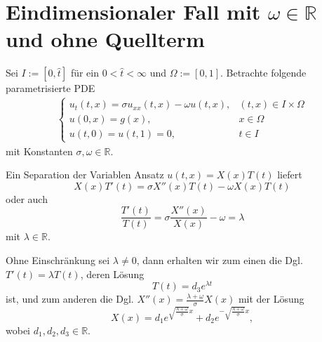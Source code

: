
\section{Eindimensionaler Fall mit $\omega \in \mathbb{R}$ und ohne Quellterm}

Sei $I := [0, \hat t]$ für ein $0 < \hat t < \infty$ und $\Omega := [0, 1]$.
Betrachte folgende parametrisierte PDE
\begin{align}
    \begin{cases}
    u_{t}(t, x) = \sigma u_{xx}(t, x) - \omega u(t, x), & (t, x) \in I \times \Omega\\
    u(0, x) = g(x), & x \in \Omega \\
    u(t, 0) = u(t, 1) = 0, & t \in I
    \end{cases}
\end{align}
mit Konstanten $\sigma, \omega \in \mathbb{R}$.

Ein Separation der Variablen Ansatz $u(t, x) = X(x) T(t)$ liefert
\begin{equation}
    X(x)T'(t) = \sigma X''(x) T(t) - \omega X(x) T(t)
\end{equation}
oder auch
\begin{equation}
    \frac{T'(t)}{T(t)} = \sigma \frac{X''(x)}{X(x)} - \omega = \lambda
\end{equation}
mit $\lambda \in \mathbb{R}$.

Ohne Einschränkung sei $\lambda \neq 0$, dann erhalten wir zum einen die Dgl.
    $T'(t) = \lambda T(t)$,
deren Lösung
\begin{equation}
    T(t) = d_{3} e^{\lambda t}
\end{equation}
ist, und zum anderen die Dgl.
    $X''(x) =  \frac{\lambda + \omega}{\sigma} X(x)$
mit der Lösung
\begin{equation}
    X(x) = d_{1} e^{\sqrt{\frac{\lambda + \omega}{\sigma}} x} + d_{2} e^{-\sqrt{\frac{\lambda + \omega}{\sigma}}x},
\end{equation}
wobei $d_{1}, d_{2}, d_{3} \in \mathbb{R}$.

